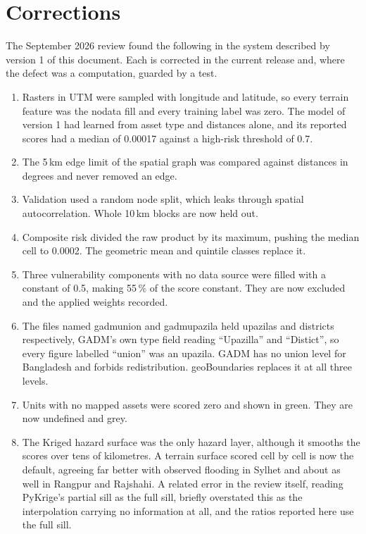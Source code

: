 \documentclass[10pt,a4paper,twocolumn]{article}
\makeatletter
\let\orig@texttt\texttt
\renewcommand{\texttt}[1]{%
  \ifmmode\text{\orig@texttt{#1}}\else
  \begingroup\ttfamily\def\_{\textunderscore\allowbreak}#1\endgroup\fi}
\makeatother
\begin{document}
\section{Corrections}
\label{sec:corrections}

The September 2026 review found the following in the system described by version 1 of this document. Each is corrected in the current release and, where the defect was a computation, guarded by a test.

\begin{enumerate}[leftmargin=*, itemsep=0.35em]
\item Rasters in UTM were sampled with longitude and latitude, so every terrain feature was the nodata fill and every training label was zero. The model of version 1 had learned from asset type and distances alone, and its reported scores had a median of 0.00017 against a high-risk threshold of 0.7.
\item The 5\,km edge limit of the spatial graph was compared against distances in degrees and never removed an edge.
\item Validation used a random node split, which leaks through spatial autocorrelation. Whole 10\,km blocks are now held out.
\item Composite risk divided the raw product by its maximum, pushing the median cell to 0.0002. The geometric mean and quintile classes replace it.
\item Three vulnerability components with no data source were filled with a constant of 0.5, making 55\,\% of the score constant. They are now excluded and the applied weights recorded.
\item The files named \texttt{gadm\_union} and \texttt{gadm\_upazila} held upazilas and districts respectively, GADM's own type field reading ``Upazilla'' and ``Distict'', so every figure labelled ``union'' was an upazila. GADM has no union level for Bangladesh and forbids redistribution. geoBoundaries replaces it at all three levels.
\item Units with no mapped assets were scored zero and shown in green. They are now undefined and grey.
\item The Kriged hazard surface was the only hazard layer, although it smooths the scores over tens of kilometres. A terrain surface scored cell by cell is now the default, agreeing far better with observed flooding in Sylhet and about as well in Rangpur and Rajshahi. A related error in the review itself, reading PyKrige's partial sill as the full sill, briefly overstated this as the interpolation carrying no information at all, and the ratios reported here use the full sill.

\end{enumerate}
\end{document}
